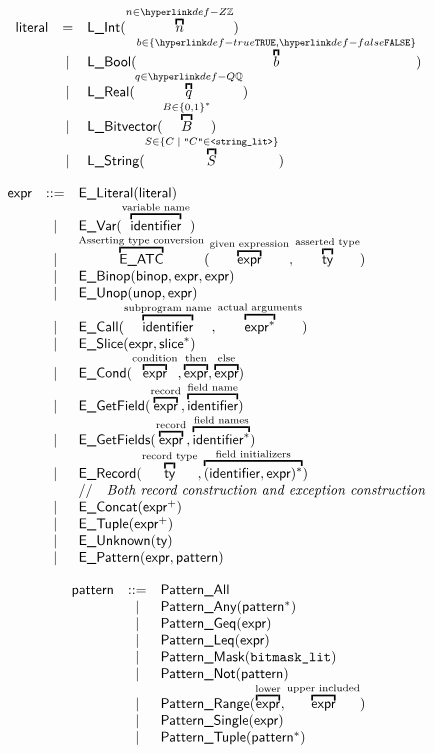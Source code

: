 \documentclass{book}
\begin{document}
\[\begin{array}{rcl}
\literal &=& \lint(\overname{n}{n \in \Z}) \\
 &|& \lbool(\overname{b}{b \in \{\True, \False\}}) \\
 &|& \lreal(\overname{q}{q \in \Q}) \\
 &|& \lbitvector(\overname{B}{B \in \{0, 1\}^*}) \\
 &|& \lstring(\overname{S}{S \in \{C \;|\; \texttt{"$C$"} \in \texttt{<string\_lit>}\}})\\
\end{array}
\]

\[
\begin{array}{rcl}
\expr &::=& \ELiteral(\literal) \\
	&|& \EVar(\overtext{\identifier}{variable name}) \\
	&|& \overtext{\EATC}{Asserting type conversion}(\overtext{\expr}{given expression}, \overtext{\ty}{asserted type}) \\
	&|& \EBinop(\binop, \expr, \expr) \\
	&|& \EUnop(\unop, \expr) \\
	&|& \ECall(\overtext{\identifier}{subprogram name}, \overtext{\expr^{*}}{actual arguments}) \\
	&|& \ESlice(\expr, \slice^{*}) \\
	&|& \ECond(\overtext{\expr}{condition}, \overtext{\expr}{then}, \overtext{\expr}{else}) \\
	&|& \EGetField(\overtext{\expr}{record}, \overtext{\identifier}{field name}) \\
	&|& \EGetFields(\overtext{\expr}{record}, \overtext{\identifier^{*}}{field names}) \\
	&|& \ERecord(\overtext{\ty}{record type}, \overtext{(\identifier, \expr)^{*}}{field initializers})\\
    & & \ASTComment{Both record construction and exception construction}\\
	&|& \EConcat(\expr^{+}) \\
	&|& \ETuple(\expr^{+}) \\
	&|& \EUnknown(\ty) \\
	&|& \EPattern(\expr, \pattern)
\end{array}
\]

\[
\begin{array}{rcl}
\pattern &::=& \PatternAll \\
  &|& \PatternAny(\pattern^{*}) \\
  &|& \PatternGeq(\expr) \\
  &|& \PatternLeq(\expr) \\
  &|& \PatternMask(\texttt{bitmask\_lit}) \\
  &|& \PatternNot(\pattern) \\
  &|& \PatternRange(\overtext{\expr}{lower}, \overtext{\expr}{upper included})\\
  &|& \PatternSingle(\expr) \\
  &|& \PatternTuple(\pattern^{*}) \\
\end{array}
\]
\end{document}

